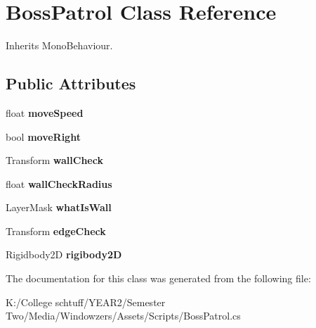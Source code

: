 \hypertarget{class_boss_patrol}{}\section{Boss\+Patrol Class Reference}
\label{class_boss_patrol}


Inherits Mono\+Behaviour.

\subsection*{Public Attributes}
\begin{DoxyCompactItemize}
\item 
\mbox{\label{class_boss_patrol_ae687fb73580e200094e31406e29c9d6d}} 
float {\bfseries move\+Speed}
\item 
\mbox{\label{class_boss_patrol_abd67ee7dd82a0124a3d6c420442b3c0b}} 
bool {\bfseries move\+Right}
\item 
\mbox{\label{class_boss_patrol_a4dc58cb16204b957f0986d29aea98f2f}} 
Transform {\bfseries wall\+Check}
\item 
\mbox{\label{class_boss_patrol_a51f76a94fad0c2a4ab5b11c828992c5d}} 
float {\bfseries wall\+Check\+Radius}
\item 
\mbox{\label{class_boss_patrol_a664ddc3988bb43ab16de92d51c2b3dad}} 
Layer\+Mask {\bfseries what\+Is\+Wall}
\item 
\mbox{\label{class_boss_patrol_a7fec5095d40742ca499ed69db8524c92}} 
Transform {\bfseries edge\+Check}
\item 
\mbox{\label{class_boss_patrol_a5a380999c49ff3eec953b0a92c4a9b85}} 
Rigidbody2D {\bfseries rigibody2D}
\end{DoxyCompactItemize}


The documentation for this class was generated from the following file\+:\begin{DoxyCompactItemize}
\item 
K\+:/\+College schtuff/\+Y\+E\+A\+R2/\+Semester Two/\+Media/\+Windowzers/\+Assets/\+Scripts/Boss\+Patrol.\+cs\end{DoxyCompactItemize}
